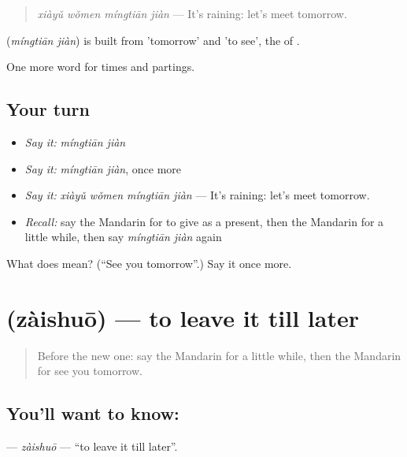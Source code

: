 \begin{quote}
\textbf{} \emph{xiàyǔ wǒmen míngtiān jiàn} — It's raining: let's meet tomorrow.
\end{quote}

\begin{cousinweb}
\textbf{} (\emph{míngtiān jiàn}) is built from  'tomorrow' and  'to see', the  of .
\end{cousinweb}

\begin{grammarlens}[title={What you've built}]
One more word for times and partings.
\end{grammarlens}

\subsection*{Your turn}
\begin{itemize}
\raggedright
  \item \emph{Say it:} \emph{míngtiān jiàn}
  \item \emph{Say it:} \emph{míngtiān jiàn}, once more
  \item \emph{Say it:} \emph{xiàyǔ wǒmen míngtiān jiàn} — It's raining: let's meet tomorrow.
  \item \emph{Recall:} say the Mandarin for to give as a present, then the Mandarin for a little while, then say \emph{míngtiān jiàn} again
\end{itemize}

\begin{tcolorbox}[breakable,colback=teal!4,colframe=teal!35!black,title={Before you move on}]
What does  mean? (\textquotedblleft{}See you tomorrow\textquotedblright{}.) Say it once more.
\end{tcolorbox}
\section[\texorpdfstring{\zh{再说} (zàishuō)}{再说 (zàishuō)}]{ (zàishuō) — to leave it till later}

\label{lesson:ZH-C76-zaishuo}



\begin{quote}
Before the new one: say the Mandarin for a little while, then the Mandarin for see you tomorrow.
\end{quote}

\subsection*{You'll want to know: }
\textbf{} — \emph{zàishuō} — \textquotedblleft{}to leave it till later\textquotedblright{}.

